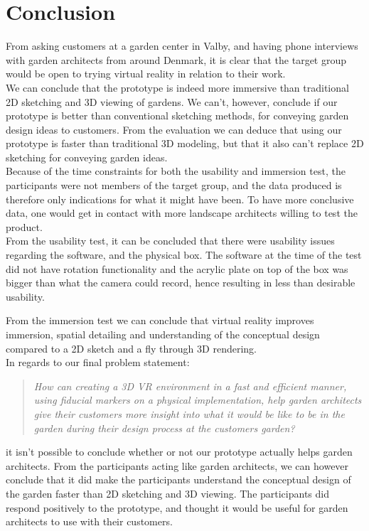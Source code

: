 \chapter{Conclusion}
From asking customers at a garden center in Valby, and having phone interviews with garden architects from around Denmark, it is clear that the target group would be open to trying virtual reality in relation to their work. \\

We can conclude that the prototype is indeed more immersive than traditional 2D sketching and 3D viewing of gardens. We can't, however, conclude if our prototype is better than conventional sketching methods, for conveying garden design ideas to customers. From the evaluation we can deduce that using our prototype is faster than traditional 3D modeling, but that it also can't replace 2D sketching for conveying garden ideas.\\

Because of the time constraints for both the usability and immersion test, the participants were not members of the target group, and the data produced is therefore only indications for what it might have been. To have more conclusive data, one would get in contact with more landscape architects willing to test the product.\\

From the usability test, it can be concluded that there were usability issues regarding the software, and the physical box. The software at the time of the test did not have rotation functionality and the acrylic plate on top of the box was bigger than what the camera could record, hence resulting in less than desirable usability.

From the immersion test we can conclude that virtual reality improves immersion, spatial detailing and understanding of the conceptual design compared to a 2D sketch and a fly through 3D rendering.\\

In regards to our final problem statement:\\
\begin{quote}
	\textit{How can creating a 3D VR environment in a fast and efficient manner, using fiducial markers on a physical implementation, help garden architects give their customers more insight into what it would be like to be in the garden during their design process at the customers garden?}\\
\end{quote}
it isn't possible to conclude whether or not our prototype actually helps garden architects. From the participants acting like garden architects, we can however conclude that it did make the participants understand the conceptual design of the garden faster than 2D sketching and 3D viewing. The participants did respond positively to the prototype, and thought it would be useful for garden architects to use with their customers.\\

